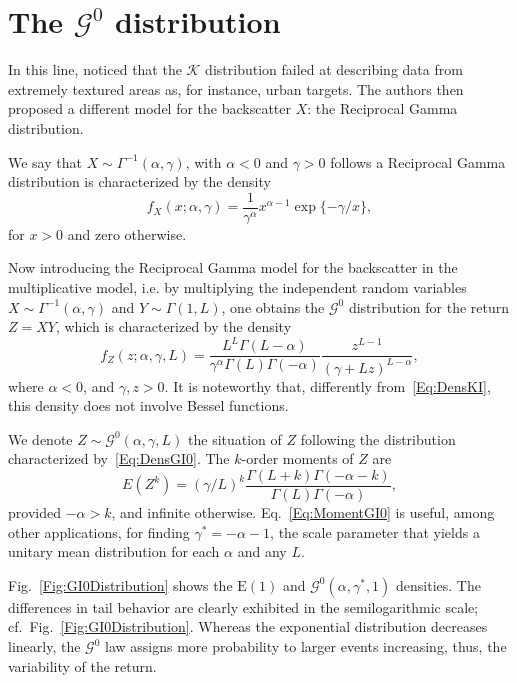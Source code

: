 \section{The $\mathcal G^0$ distribution}

In this line, \citet{frery96} noticed that the $\mathcal{K}$ distribution failed at describing data from extremely textured areas as, for instance, urban targets.
The authors then proposed a different model for the backscatter $X$: the Reciprocal Gamma distribution.

We say that $X\sim{\Gamma^{-1}}(\alpha,\gamma)$, with $\alpha<0$ and $\gamma>0$ follows a 
Reciprocal Gamma distribution is characterized by the density
\begin{equation}
f_X(x;\alpha,\gamma) = \frac{1}{\gamma^\alpha} x^{\alpha-1} \exp\{-\gamma/x\},
\label{Eq:IGdensity}
\end{equation}
for $x>0$ and zero otherwise.

Now introducing the Reciprocal Gamma model for the backscatter in the multiplicative model, i.e. by multiplying the independent random variables $X\sim{\Gamma^{-1}}(\alpha,\gamma)$ and $Y\sim\Gamma(1,L)$, one obtains the $\mathcal{G}^0$ distribution for the return $Z=XY$, which is characterized by the density
\begin{equation}
f_Z(z; \alpha,\gamma,L) = \frac{L^L \Gamma(L-\alpha)}{\gamma^\alpha \Gamma(L)\Gamma(-\alpha)} \frac{z^{L-1}}{(\gamma+L z)^{L-\alpha}},
\label{Eq:DensGI0}
\end{equation}
where $\alpha<0$, and $\gamma,z>0$.
It is noteworthy that, differently from~\eqref{Eq:DensKI}, this density does not involve Bessel functions.

We denote $Z\sim \mathcal G^0(\alpha,\gamma,L)$ the situation of $Z$ following the distribution characterized by~\eqref{Eq:DensGI0}.
The $k$-order moments of $Z$ are
\begin{equation}
E(Z^k) = (\gamma / L)^{k} \frac{\Gamma(L+k)\Gamma(-\alpha-k)}{\Gamma(L)\Gamma(-\alpha)},
\label{Eq:MomentGI0}
\end{equation}
provided $-\alpha>k$, and infinite otherwise.
Eq.~\eqref{Eq:MomentGI0} is useful, among other applications, for finding $\gamma^*=-\alpha-1$, the scale parameter that yields a unitary mean distribution for each $\alpha$ and any $L$.

Fig.~\ref{Fig:GI0Distribution} shows the $\text{E}(1)$ and $\mathcal G^0(\alpha,\gamma^*, 1)$ densities.
The differences in tail behavior are clearly exhibited in the semilogarithmic scale; cf.\ Fig.~\ref{Fig:GI0Distribution}.
Whereas the exponential distribution decreases linearly, the $\mathcal G^0$ law assigns more probability to larger events increasing, thus, the variability of the return.

